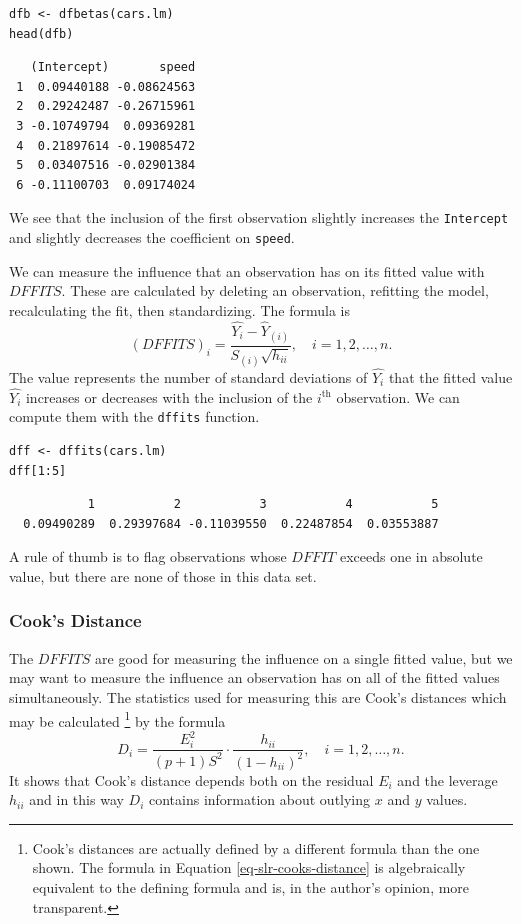 \documentclass[captions=tableheading]{scrbook}
\begin{document}
\begin{verbatim}
dfb <- dfbetas(cars.lm)
head(dfb)
\end{verbatim}

\begin{verbatim}
   (Intercept)       speed
 1  0.09440188 -0.08624563
 2  0.29242487 -0.26715961
 3 -0.10749794  0.09369281
 4  0.21897614 -0.19085472
 5  0.03407516 -0.02901384
 6 -0.11100703  0.09174024
\end{verbatim}

We see that the inclusion of the first observation slightly increases the \texttt{Intercept} and slightly decreases the coefficient on \texttt{speed}.

We can measure the influence that an observation has on its fitted value with \(DFFITS\). These are calculated by deleting an observation, refitting the model, recalculating the fit, then standardizing. The formula is 
\begin{equation}
(DFFITS)_{i}=\frac{\hat{Y_{i}}-\hat{Y}_{(i)}}{S_{(i)}\sqrt{h_{ii}}},\quad i=1,2,\ldots,n.
\end{equation}
The value represents the number of standard deviations of \(\hat{Y_{i}}\) that the fitted value \(\hat{Y_{i}}\) increases or decreases with the inclusion of the \(i^{\textrm{th}}\) observation. We can compute them with the \texttt{dffits} function.


\begin{verbatim}
dff <- dffits(cars.lm)
dff[1:5]
\end{verbatim}

\begin{verbatim}
           1           2           3           4           5 
  0.09490289  0.29397684 -0.11039550  0.22487854  0.03553887
\end{verbatim}

A rule of thumb is to flag observations whose \(DFFIT\) exceeds one in absolute value, but there are none of those in this data set.
\subsubsection{Cook's Distance}
\label{sec-11-5-4-2}


The \(DFFITS\) are good for measuring the influence on a single fitted value, but we may want to measure the influence an observation has on all of the fitted values simultaneously. The statistics used for measuring this are Cook's distances which may be calculated
\footnote{Cook's distances are actually defined by a different formula than the one shown. The formula in Equation \ref{eq-slr-cooks-distance} is algebraically equivalent to the defining formula and is, in the author's opinion, more transparent.}
by the formula
\begin{equation}
D_{i}=\frac{E_{i}^{2}}{(p+1)S^{2}}\cdot\frac{h_{ii}}{(1-h_{ii})^{2}},\quad i=1,2,\ldots,n.\label{eq-slr-cooks-distance}
\end{equation}
It shows that Cook's distance depends both on the residual \(E_{i}\) and the leverage \(h_{ii}\) and in this way \(D_{i}\) contains information about outlying \(x\) and \(y\) values.
\end{document}
